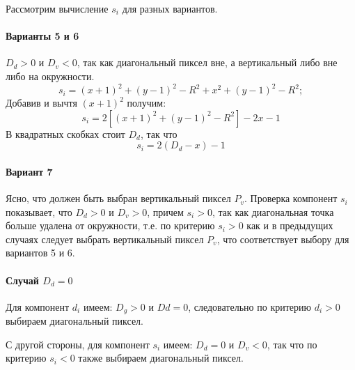 Рассмотрим вычисление $s_i$ для разных вариантов.

\paragraph{Варианты 5 и 6}

$D_d > 0$ и $D_v < 0$, так как диагональный пиксел вне, а вертикальный либо вне либо на окружности.
$$
s_i = (x+1)^2 + (y-1)^2 - R^2 + x^2 + (y-1)^2 - R^2;
$$
Добавив и вычтя $(x+1)^2$ получим:
$$
s_i = 2[(x+1)^2 + (y-1)^2 - R^2] - 2x - 1
$$
В квадратных скобках стоит $D_d$, так что
$$
s_i = 2(D_d - x) - 1
$$
\paragraph{Вариант 7}

Ясно, что должен быть выбран вертикальный пиксел $P_v$. Проверка компонент $s_i$ показывает, что $D_d > 0$ и $D_v > 0$, причем $s_i > 0$, так как диагональная точка больше удалена от окружности, т.е. по критерию $s_i > 0$ как и в предыдущих случаях следует выбрать вертикальный пиксел $P_v$, что соответствует выбору для вариантов 5 и 6. 


\paragraph{Случай $D_d = 0$}
Для компонент $d_i$ имеем: $D_g > 0$ и $Dd = 0$, следовательно по критерию $d_i > 0$ выбираем диагональный пиксел.

С другой стороны, для компонент $s_i$ имеем: $D_d = 0$ и $D_v < 0$, так что по критерию $s_i < 0$ также выбираем диагональный пиксел.

